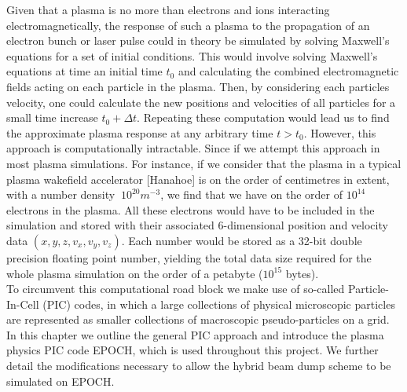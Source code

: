 \indent Given that a plasma is no more than electrons and ions interacting electromagnetically, the response of such a plasma to the propagation of an electron bunch or laser pulse could in theory be simulated by solving Maxwell's equations for a set of initial conditions. This would involve solving Maxwell's equations at time an initial time $t_0$ and calculating the combined electromagnetic fields acting on each particle in the plasma. Then, by considering each particles velocity, one could calculate the new positions and velocities of all particles for a small time increase $t_0+\Delta t$. Repeating these computation would  lead us to find the approximate plasma response at any arbitrary time $t>t_0$. However, this approach is computationally intractable. Since if we attempt this approach in most plasma simulations. For instance, if we consider that the plasma in a typical plasma wakefield accelerator [Hanahoe] is on the order of centimetres in extent, with a number density $~10^{20} m^{-3}$, we find that we have on the order of $10^{14}$ electrons in the plasma. All these electrons would have to be included in the simulation and stored with their associated 6-dimensional position and velocity data $(x,y,z,v_x,v_y,v_z)$. Each number would be stored as a 32-bit double precision floating point number, yielding the total data size required for the whole plasma simulation on the order of a petabyte ($10^{15}$ bytes).\\
\indent To circumvent this computational road block we make use of so-called Particle-In-Cell (PIC) codes, in which a large collections of physical microscopic particles are represented as smaller collections of macroscopic pseudo-particles on a grid. In this chapter we outline the general PIC approach and introduce the plasma physics PIC code EPOCH, which is used throughout this project. We further detail the modifications necessary to allow the hybrid beam dump scheme to be simulated on EPOCH. 



